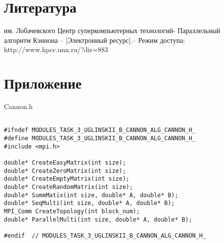 \documentclass[12pt, letterpaper]{article}
\begin{document}
\section*{Литература}
\begin{enumerate}
     им. Лобачевского Центр суперкомпьютерных технологий-
    Параллельный алгоритм Кэннона – [Электронный ресурс].– Режим доступа: http://www.hpcc.unn.ru/?dir=883
\end{enumerate}
\newpage

\section*{Приложение}
Cannon.h
\begin{lstlisting}

#ifndef MODULES_TASK_3_UGLINSKII_B_CANNON_ALG_CANNON_H_
#define MODULES_TASK_3_UGLINSKII_B_CANNON_ALG_CANNON_H_
#include <mpi.h>

double* CreateEasyMatrix(int size);
double* CreateZeroMatrix(int size);
double* CreateEmptyMatrix(int size);
double* CreateRandomMatrix(int size);
double* SummMatix(int size, double* A, double* B);
double* SeqMulti(int size, double* A, double* B);
MPI_Comm CreateTopology(int block_num);
double* ParallelMulti(int size, double* A, double* B);

#endif  // MODULES_TASK_3_UGLINSKII_B_CANNON_ALG_CANNON_H_

\end{lstlisting}
\end{document}
